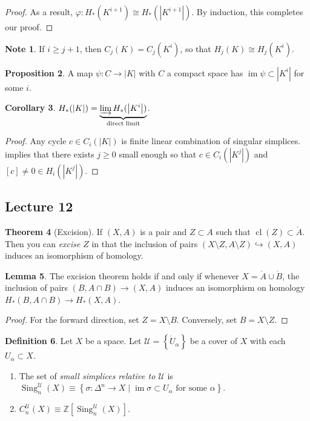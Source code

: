 \documentclass[10pt,letterpaper,cm]{nupset}
\theoremstyle{definition}
\newtheorem{definition}{Definition}[subsection]
\newtheorem{note}[definition]{Note}
\theoremstyle{theorem}
\newtheorem{theorem}[definition]{Theorem}
\newtheorem{lemma}[definition]{Lemma}
\newtheorem{prop}[definition]{Proposition}
\newtheorem{corollary}[definition]{Corollary}
\theoremstyle{remark}
\newcommand{\U}{\mathcal U}
\newcommand{\Z}{\mathbb Z}
\newcommand{\1}{\mathbb{1}}
\newcommand{\0}{\vec 0}
\DeclareMathOperator{\im}{im}
\DeclareMathOperator{\cl}{cl}
\DeclareMathOperator{\sing}{Sing}
\begin{document}
\begin{proof}
As a result, $\varphi : H_{\ast}(K^{i+1}) \cong H_{\ast}(\left\lvert{K^{i+1}}\right\rvert)$. By induction, this completes our proof.
\end{proof}

\begin{note}
If $i\geq j+1$, then $C_j(K) = C_j(K^i)$, so that $H_j(K) \cong H_j(K^i)$.
\end{note}

\begin{prop}\label{p1}
A map $\psi : C \to \left\lvert{K}\right\rvert$ with $C$ a compact space has $\im{\psi} \subset \left\lvert{K^i}\right\rvert$ for some $i$.
\end{prop}

\begin{corollary}
$H_{\ast}(\left\lvert{K}\right\rvert) = \underbrace{\varinjlim H_{\ast}(\left\lvert{K^i}\right\rvert)}_{\text{direct limit}}$.
\end{corollary}
\begin{proof}
Any cycle $c\in C_i(\left\lvert{K}\right\rvert)$ is finite linear combination of singular simplices.  implies that there exists $j\geq 0$ small enough so that $c \in  C_i(\left\lvert{K^j}\right\rvert)$ and $[c]\ne 0 \in H_i(\left\lvert{K^j}\right\rvert)$.
\end{proof}


\subsection{Lecture 12}

\begin{theorem}[Excision]
If $(X, A)$ is a pair and $Z\subset A$ such that $\cl(Z) \subset \mathring{A}$. Then you can \textit{excise} $Z$ in that the inclusion of pairs $(X\setminus Z, A \setminus Z) \hookrightarrow (X, A)$ induces an isomorphism of homology. 
\end{theorem}

\begin{lemma}\label{l25}
The excision theorem holds if and only if whenever $X= \mathring{A} \cup \mathring{B}$, the inclusion of pairs $(B, A\cap B) \to (X,A)$ induces an isomorphism on homology $H_{\ast}(B, A\cap B) \to H_{\ast}(X,A)$.
\end{lemma}
\begin{proof}
For the forward direction, set $Z= X\setminus B$. Conversely, set $B = X \setminus Z$.
\end{proof}

\begin{definition} Let $X$ be a space. Let $\mathcal{U} =\left\{\mathring{U}_{\alpha}\right\}$ be a cover of $X$ with each $U_{\alpha} \subset X$.
\begin{enumerate}
\item The set of  \textit{small simplices relative to $\U$} is $\sing_n^{\U}(X) \equiv \left\{\sigma : \Delta^n  \to X \mid \im{\sigma}\subset U_{\alpha} \text{ for some }\alpha\right\}$.
\item $C_n^{\U}(X) \equiv\Z\left[\sing_n^{\U}(X)\right]$.
\end{enumerate}
\end{definition}
\end{document}
